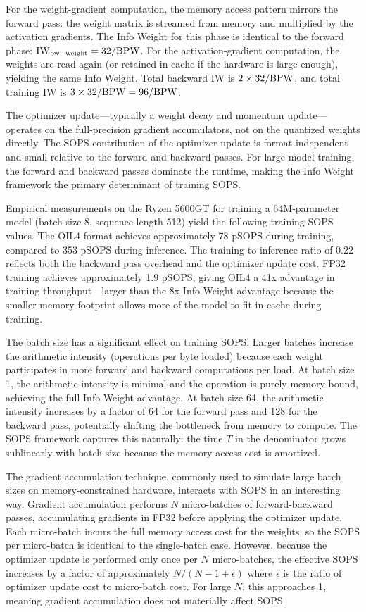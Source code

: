 For the weight-gradient computation, the memory access pattern mirrors the forward pass: the weight matrix is streamed from memory and multiplied by the activation gradients. The Info Weight for this phase is identical to the forward phase: $\mathrm{IW}_{\text{bw\_weight}} = 32 / \textnormal{BPW}$. For the activation-gradient computation, the weights are read again (or retained in cache if the hardware is large enough), yielding the same Info Weight. Total backward IW is $2 \times 32 / \textnormal{BPW}$, and total training IW is $3 \times 32 / \textnormal{BPW} = 96 / \textnormal{BPW}$.

The optimizer update---typically a weight decay and momentum update---operates on the full-precision gradient accumulators, not on the quantized weights directly. The SOPS contribution of the optimizer update is format-independent and small relative to the forward and backward passes. For large model training, the forward and backward passes dominate the runtime, making the Info Weight framework the primary determinant of training SOPS.

Empirical measurements on the Ryzen 5600GT for training a 64M-parameter model (batch size 8, sequence length 512) yield the following training SOPS values. The OIL4 format achieves approximately 78 pSOPS during training, compared to 353 pSOPS during inference. The training-to-inference ratio of 0.22 reflects both the backward pass overhead and the optimizer update cost. FP32 training achieves approximately 1.9 pSOPS, giving OIL4 a 41x advantage in training throughput---larger than the 8x Info Weight advantage because the smaller memory footprint allows more of the model to fit in cache during training.

The batch size has a significant effect on training SOPS. Larger batches increase the arithmetic intensity (operations per byte loaded) because each weight participates in more forward and backward computations per load. At batch size 1, the arithmetic intensity is minimal and the operation is purely memory-bound, achieving the full Info Weight advantage. At batch size 64, the arithmetic intensity increases by a factor of 64 for the forward pass and 128 for the backward pass, potentially shifting the bottleneck from memory to compute. The SOPS framework captures this naturally: the time $T$ in the denominator grows sublinearly with batch size because the memory access cost is amortized.

The gradient accumulation technique, commonly used to simulate large batch sizes on memory-constrained hardware, interacts with SOPS in an interesting way. Gradient accumulation performs $N$ micro-batches of forward-backward passes, accumulating gradients in FP32 before applying the optimizer update. Each micro-batch incurs the full memory access cost for the weights, so the SOPS per micro-batch is identical to the single-batch case. However, because the optimizer update is performed only once per $N$ micro-batches, the effective SOPS increases by a factor of approximately $N / (N - 1 + \epsilon)$ where $\epsilon$ is the ratio of optimizer update cost to micro-batch cost. For large $N$, this approaches 1, meaning gradient accumulation does not materially affect SOPS.

